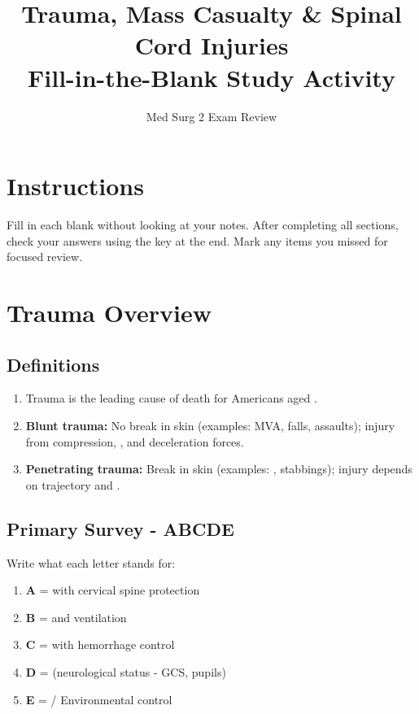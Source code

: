 \documentclass[11pt]{article}
\title{\textbf{Trauma, Mass Casualty \& Spinal Cord Injuries}\\Fill-in-the-Blank Study Activity}
\author{Med Surg 2 Exam Review}
\date{}
\begin{document}
\maketitle

\section*{Instructions}
Fill in each blank without looking at your notes. After completing all sections, check your answers using the key at the end. Mark any items you missed for focused review.

\hrulefill

\section{Trauma Overview}

\subsection{Definitions}
\begin{enumerate}
    \item Trauma is the leading cause of death for Americans aged \underline{\hspace{2cm}}.
    
    \item \textbf{Blunt trauma:} No break in skin (examples: MVA, falls, assaults); injury from compression, \underline{\hspace{2cm}}, and deceleration forces.
    
    \item \textbf{Penetrating trauma:} Break in skin (examples: \underline{\hspace{3cm}}, stabbings); injury depends on trajectory and \underline{\hspace{2cm}}.
\end{enumerate}

\subsection{Primary Survey - ABCDE}
Write what each letter stands for:

\begin{enumerate}
    \item \textbf{A} = \underline{\hspace{4cm}} with cervical spine protection
    \item \textbf{B} = \underline{\hspace{4cm}} and ventilation
    \item \textbf{C} = \underline{\hspace{4cm}} with hemorrhage control
    \item \textbf{D} = \underline{\hspace{4cm}} (neurological status - GCS, pupils)
    \item \textbf{E} = \underline{\hspace{4cm}} / Environmental control
\end{enumerate}
\end{document}
